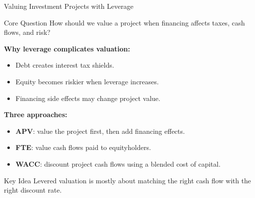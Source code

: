 \begin{frame}{Valuing Investment Projects with Leverage}

\begin{block}{Core Question}
How should we value a project when financing affects taxes, cash flows,
and risk?
\end{block}

\textbf{Why leverage complicates valuation:}
\begin{itemize}
    \item Debt creates interest tax shields.
    \item Equity becomes riskier when leverage increases.
    \item Financing side effects may change project value.
\end{itemize}

\textbf{Three approaches:}
\begin{itemize}
    \item \textbf{APV}: value the project first, then add financing effects.
    \item \textbf{FTE}: value cash flows paid to equityholders.
    \item \textbf{WACC}: discount project cash flows using a blended cost of capital.
\end{itemize}

\vfill

\begin{alertblock}{Key Idea}
Levered valuation is mostly about matching the right cash flow with the
right discount rate.
\end{alertblock}

\end{frame}

